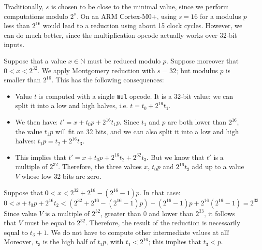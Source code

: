 \documentclass{llncs}
\newcommand{\bN}{\mathbb{N}}
\begin{document}
Traditionally, $s$ is chosen to be close to the minimal value, since we
perform computations modulo $2^s$. On an ARM Cortex-M0+, using $s = 16$
for a modulus $p$ less than $2^{16}$ would lead to a reduction using
about 15 clock cycles. However, we can do much better, since the
multiplication opcode actually works over 32-bit inputs.

Suppose that a value $x \in \bN$ must be reduced modulo $p$. Suppose
moreover that $0 < x < 2^{32}$. We apply Montgomery reduction with $s = 32$;
but modulus $p$ is smaller than $2^{16}$. This has the following consequences:
\begin{itemize}

    \item Value $t$ is computed with a single \verb+mul+ opcode. It is
    a 32-bit value; we can split it into a low and high halves, i.e.
    $t = t_0 + 2^{16} t_1$.

    \item We then have: $t' = x + t_0 p + 2^{16} t_1 p$. Since $t_1$ and
    $p$ are both lower than $2^{16}$, the value $t_1 p$ will fit on
    32 bits, and we can also split it into a low and high halves:
    $t_1 p = t_2 + 2^{16} t_3$.

    \item This implies that $t' = x + t_0 p + 2^{16} t_2 + 2^{32} t_3$.
    But we know that $t'$ is a multiple of $2^{32}$. Therefore, the
    three values $x$, $t_0 p$ and $2^{16} t_2$ add up to a value $V$ whose
    low 32 bits are zero.

\end{itemize}

Suppose that $0 < x < 2^{32}+2^{16}-(2^{16}-1)p$. In that case:
\begin{equation*}
    0 < x + t_0 p + 2^{16} t_2 < (2^{32}+2^{16}-(2^{16}-1)p) + (2^{16}-1)p + 2^{16}(2^{16}-1) = 2^{33}
\end{equation*}
Since value $V$ is a multiple of $2^{32}$, greater than $0$ and lower than
$2^{33}$, it follows that $V$ must be equal to $2^{32}$. Therefore, the
result of the reduction is necessarily equal to $t_3 + 1$. We do not have
to compute other intermediate values at all! Moreover, $t_3$ is the high
half of $t_1 p$, with $t_1 < 2^{16}$; this implies that $t_3 < p$.
\end{document}

